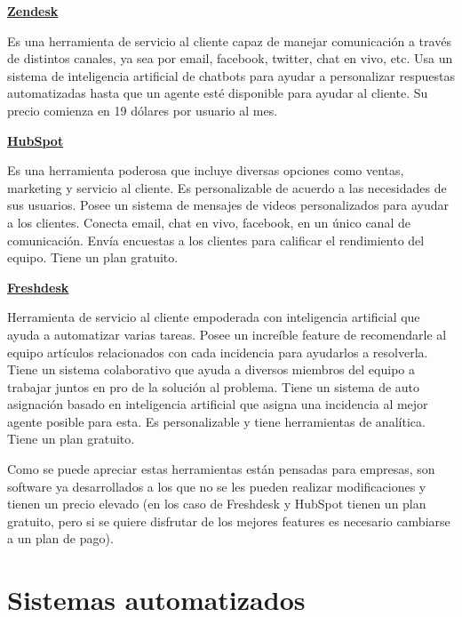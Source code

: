 \textbf{\href{https://www.zendesk.com/}{Zendesk}}
\newline

Es una herramienta de servicio al cliente capaz de manejar comunicación a través de distintos canales, ya sea por email, facebook, twitter, chat en vivo, etc. Usa un sistema de inteligencia artificial de chatbots para ayudar a personalizar respuestas automatizadas hasta que un agente esté disponible para ayudar al cliente. Su precio comienza en 19 dólares por usuario al mes.
\newline

\textbf{\href{https://www.hubspot.com/}{HubSpot}}
\newline

Es una herramienta poderosa que incluye diversas opciones como ventas, marketing y servicio al cliente. Es personalizable de acuerdo a las necesidades de sus usuarios. Posee un sistema de mensajes de videos personalizados para ayudar a los clientes. Conecta email, chat en vivo, facebook, en un único canal de comunicación. Envía encuestas a los clientes para calificar el rendimiento del equipo. Tiene un plan gratuito.
\newline

\textbf{\href{https://freshdesk.com/}{Freshdesk}}
\newline

Herramienta de servicio al cliente empoderada con inteligencia artificial que ayuda a automatizar varias tareas. Posee un increíble feature de recomendarle al equipo artículos relacionados con cada incidencia para ayudarlos a resolverla. Tiene un sistema colaborativo que ayuda a diversos miembros del equipo a trabajar juntos en pro de la solución al problema. Tiene un sistema de auto asignación basado en inteligencia artificial que asigna una incidencia al mejor agente posible para esta. Es personalizable y tiene herramientas de analítica. Tiene un plan gratuito.
\newline

Como se puede apreciar estas herramientas están pensadas para empresas, son software ya desarrollados a los que no se les pueden realizar modificaciones y tienen un precio elevado (en los caso de Freshdesk y HubSpot tienen un plan gratuito, pero si se quiere disfrutar de los mejores features es necesario cambiarse a un plan de pago).

\section{Sistemas automatizados}

